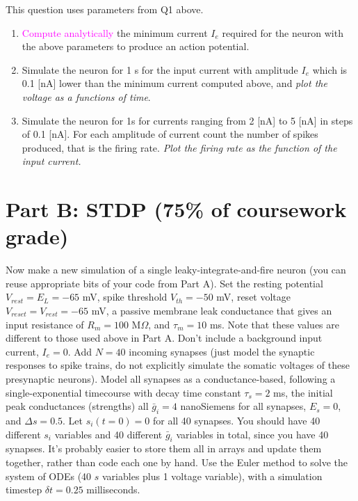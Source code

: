 \documentclass[12pt]{article}
\begin{document}
This question uses parameters from Q1 above.

\begin{enumerate}

\item \textcolor{magenta}{Compute analytically} the minimum current $I_e$ required for the
  neuron with the above parameters to produce an action
  potential.

\item Simulate the neuron for 1 s for the input current with amplitude
  $I_e$ which is 0.1 [nA] lower than the minimum current computed
  above, and \emph{plot the voltage as a functions of time}.

\item Simulate the neuron for 1s for currents ranging from 2 [nA] to 5
  [nA] in steps of 0.1 [nA]. For each amplitude of current count the
  number of spikes produced, that is the firing rate. \emph{Plot the firing
  rate as the function of the input current.} 

\end{enumerate}

\section*{Part B: STDP (75\% of coursework grade)}
Now make a new simulation of a single leaky-integrate-and-fire neuron (you can reuse appropriate bits of your code from Part A). Set the resting potential $V_{rest}= E_L = -65$ mV,
spike threshold $V_{th}=-50$ mV, reset voltage $V_{reset}=V_{rest}=-65$
mV, a passive membrane leak conductance that gives an input resistance
of $R_{m}=100$ M$\Omega$, and $\tau_{m}=10$
ms. Note that these values are different to those used above in Part A. Don't include a background input current, $I_e=0$. Add $N=40$ incoming synapses (just model the synaptic responses to spike trains, do not
explicitly simulate the somatic voltages of these presynaptic neurons).
Model all synapses as a conductance-based, following a single-exponential
timecourse with decay time constant $\tau_{s}=2$ ms, the initial
peak conductances (strengths) all $\bar{g}_i = 4$ nanoSiemens for all synapses, $E_s=0$, and $\Delta s=0.5$. Let $s_i (t=0)=0$ for all 40 synapses. You should have 40 different $s_i$ variables and 40 different $\bar{g}_i$ variables in total, since you have 40 synapses. It's probably easier to store them all in arrays and update them together, rather than code each one by hand. Use the Euler method to solve the system of ODEs (40 $s$ variables plus 1 voltage variable), with a simulation timestep $\delta t=0.25$ milliseconds.
\end{document}
